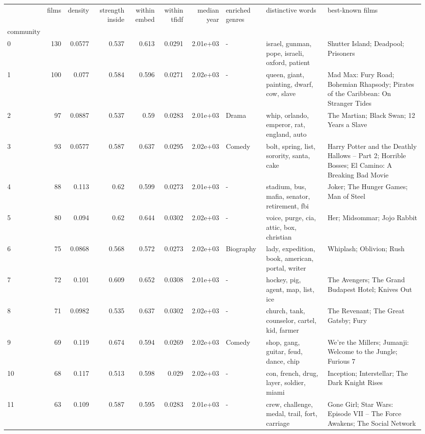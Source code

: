 \begin{tabular}{lrrrrrrlll}
\toprule
 & films & density & strength inside & within embed & within tfidf & median year & enriched genres & distinctive words & best-known films \\
community &  &  &  &  &  &  &  &  &  \\
\midrule
0 & 130 & 0.0577 & 0.537 & 0.613 & 0.0291 & 2.01e+03 & - & israel, gunman, pope, israeli, oxford, patient & Shutter Island; Deadpool; Prisoners \\
1 & 100 & 0.077 & 0.584 & 0.596 & 0.0271 & 2.02e+03 & - & queen, giant, painting, dwarf, cow, slave & Mad Max: Fury Road; Bohemian Rhapsody; Pirates of the Caribbean: On Stranger Tides \\
2 & 97 & 0.0887 & 0.537 & 0.59 & 0.0283 & 2.01e+03 & Drama & whip, orlando, emperor, rat, england, auto & The Martian; Black Swan; 12 Years a Slave \\
3 & 93 & 0.0577 & 0.587 & 0.637 & 0.0295 & 2.02e+03 & Comedy & bolt, spring, list, sorority, santa, cake & Harry Potter and the Deathly Hallows – Part 2; Horrible Bosses; El Camino: A Breaking Bad Movie \\
4 & 88 & 0.113 & 0.62 & 0.599 & 0.0273 & 2.01e+03 & - & stadium, bus, mafia, senator, retirement, fbi & Joker; The Hunger Games; Man of Steel \\
5 & 80 & 0.094 & 0.62 & 0.644 & 0.0302 & 2.02e+03 & - & voice, purge, cia, attic, box, christian & Her; Midsommar; Jojo Rabbit \\
6 & 75 & 0.0868 & 0.568 & 0.572 & 0.0273 & 2.02e+03 & Biography & lady, expedition, book, american, portal, writer & Whiplash; Oblivion; Rush \\
7 & 72 & 0.101 & 0.609 & 0.652 & 0.0308 & 2.01e+03 & - & hockey, pig, agent, map, list, ice & The Avengers; The Grand Budapest Hotel; Knives Out \\
8 & 71 & 0.0982 & 0.535 & 0.637 & 0.0302 & 2.02e+03 & - & church, tank, counselor, cartel, kid, farmer & The Revenant; The Great Gatsby; Fury \\
9 & 69 & 0.119 & 0.674 & 0.594 & 0.0269 & 2.02e+03 & Comedy & shop, gang, guitar, feud, dance, chip & We're the Millers; Jumanji: Welcome to the Jungle; Furious 7 \\
10 & 68 & 0.117 & 0.513 & 0.598 & 0.029 & 2.02e+03 & - & con, french, drug, layer, soldier, miami & Inception; Interstellar; The Dark Knight Rises \\
11 & 63 & 0.109 & 0.587 & 0.595 & 0.0283 & 2.01e+03 & - & crew, challenge, medal, trail, fort, carriage & Gone Girl; Star Wars: Episode VII – The Force Awakens; The Social Network \\

\end{tabular}
